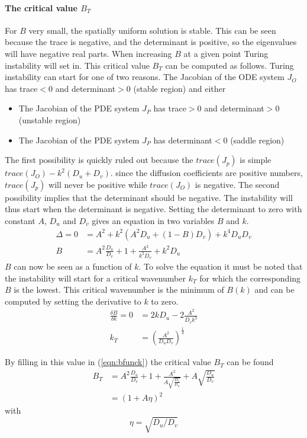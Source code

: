 \paragraph{The critical value $B_T$}\hfill\newline
For $B$ very small, the spatially uniform solution is stable. This can be seen because the trace is negative, and the determinant is positive, so the eigenvalues will have negative real parts. When increasing $B$ at a given point Turing instability will set in. This critical value $B_T$ can be computed as follows. Turing instability can start for one of two reasons.
The Jacobian of the ODE system $J_O$ has trace$<0$ and determinant$>0$ (stable region) and either
\begin{itemize}
\item The Jacobian of the PDE system $J_P$ has trace$>0$ and determinant$>0$ (unstable region)
\item The Jacobian of the PDE system $J_P$ has determinant$<0$ (saddle region)
\end{itemize}
The first possibility is quickly ruled out because the $trace(J_p)$ is simple $trace(J_O)-k^2(D_u+D_v)$. since the diffusion coefficients are positive numbers, $trace(J_p)$ will never be positive while $trace(J_O)$ is negative.
\newline
\newline
The second possibility implies that the determinant should be negative. The instability will thus start when the determinant is negative. Setting the determinant to zero  with constant $A$, $D_u$ and $D_v$ gives an equation in two variables $B$ and $k$.
\begin{align}
\Delta = 0 &=A^2 + k^2(A^2D_u+(1-B)D_v)+k^4D_uD_v \\
B&=A^2\frac{D_u}{D_v}+1+\frac{A^2}{k^2D_v}+k^2D_u  \label{eqn:bfunck}
\end{align}
$B$ can now be seen as a function of $k$. To solve the equation it must be noted that the instability will start for a critical wavenumber $k_T$ for which the corresponding $B$ is the lowest. This critical wavenumber is the minimum of $B(k)$ and can be computed by setting the derivative to $k$ to zero.
\begin{align}
\frac{\delta B}{\delta k}=0&=2kD_u-2\frac{A^2}{D_vk^3} \\
k_T&=\left(\frac{A^2}{D_uD_v}\right)^{\frac{1}{4}}
\end{align}

By filling in this value in (\ref{eqn:bfunck}) the critical value $B_T$ can be found
\begin{align}
B_T&=A^2\frac{D_u}{D_v}+1+\frac{A^2}{A\sqrt{\frac{D_v}{D_u}}}+A\sqrt{\frac{D_u}{D_v}} \\
 &=(1+A\eta)^2
\end{align}
with 
\begin{equation}
\eta=\sqrt{D_u/D_v}
\end{equation}
